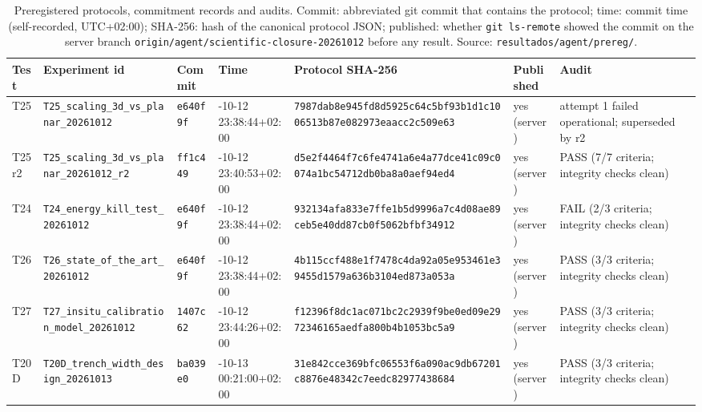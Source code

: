 \begin{table}[htbp]\centering\scriptsize
\caption{Preregistered protocols, commitment records and audits. Commit: abbreviated git commit that contains the protocol; time: commit time (self-recorded, UTC+02:00); SHA-256: hash of the canonical protocol JSON; published: whether \texttt{git ls-remote} showed the commit on the server branch \texttt{origin/agent/scientific-closure-20261012} before any result. Source: \texttt{resultados/agent/prereg/}.}\label{tab:protocols}
\setlength{\tabcolsep}{3pt}
\begin{tabular}{@{}l>{\raggedright\arraybackslash}p{2.7cm}l>{\raggedright\arraybackslash}p{1.95cm}>{\raggedright\arraybackslash}p{2.45cm}>{\raggedright\arraybackslash}p{1.3cm}>{\raggedright\arraybackslash}p{2.75cm}@{}}
\toprule Test & Experiment id & Commit & Time & Protocol SHA-256 & Published & Audit \\ \midrule
T25 & \texttt{T25\_\allowbreak{}scaling\_\allowbreak{}3d\_\allowbreak{}vs\_\allowbreak{}planar\_\allowbreak{}20261012} & \texttt{e640f9f} & 2026-10-12 23:38:44+02:00 & \texttt{7987dab8e945fd8d\allowbreak 5925c64c5bf93b1d\allowbreak 1c1006513b87e082\allowbreak 973eaacc2c509e63} & yes (server) & attempt 1 failed operational; superseded by r2 \\
T25r2 & \texttt{T25\_\allowbreak{}scaling\_\allowbreak{}3d\_\allowbreak{}vs\_\allowbreak{}planar\_\allowbreak{}20261012\_\allowbreak{}r2} & \texttt{ff1c449} & 2026-10-12 23:40:53+02:00 & \texttt{d5e2f4464f7c6fe4\allowbreak 741a6e4a77dce41c\allowbreak 09c0074a1bc54712\allowbreak db0ba8a0aef94ed4} & yes (server) & PASS (7/\allowbreak{}7 criteria; integrity checks clean) \\
T24 & \texttt{T24\_\allowbreak{}energy\_\allowbreak{}kill\_\allowbreak{}test\_\allowbreak{}20261012} & \texttt{e640f9f} & 2026-10-12 23:38:44+02:00 & \texttt{932134afa833e7ff\allowbreak e1b5d9996a7c4d08\allowbreak ae89ceb5e40dd87c\allowbreak b0f5062bfbf34912} & yes (server) & FAIL (2/\allowbreak{}3 criteria; integrity checks clean) \\
T26 & \texttt{T26\_\allowbreak{}state\_\allowbreak{}of\_\allowbreak{}the\_\allowbreak{}art\_\allowbreak{}20261012} & \texttt{e640f9f} & 2026-10-12 23:38:44+02:00 & \texttt{4b115ccf488e1f74\allowbreak 78c4da92a05e9534\allowbreak 61e39455d1579a63\allowbreak 6b3104ed873a053a} & yes (server) & PASS (3/\allowbreak{}3 criteria; integrity checks clean) \\
T27 & \texttt{T27\_\allowbreak{}insitu\_\allowbreak{}calibration\_\allowbreak{}model\_\allowbreak{}20261012} & \texttt{1407c62} & 2026-10-12 23:44:26+02:00 & \texttt{f12396f8dc1ac071\allowbreak bc2c2939f9be0ed0\allowbreak 9e2972346165aedf\allowbreak a800b4b1053bc5a9} & yes (server) & PASS (3/\allowbreak{}3 criteria; integrity checks clean) \\
T20D & \texttt{T20D\_\allowbreak{}trench\_\allowbreak{}width\_\allowbreak{}design\_\allowbreak{}20261013} & \texttt{ba039e0} & 2026-10-13 00:21:00+02:00 & \texttt{31e842cce369bfc0\allowbreak 6553f6a090ac9db6\allowbreak 7201c8876e48342c\allowbreak 7eedc82977438684} & yes (server) & PASS (3/\allowbreak{}3 criteria; integrity checks clean) \\
\bottomrule\end{tabular}\end{table}
